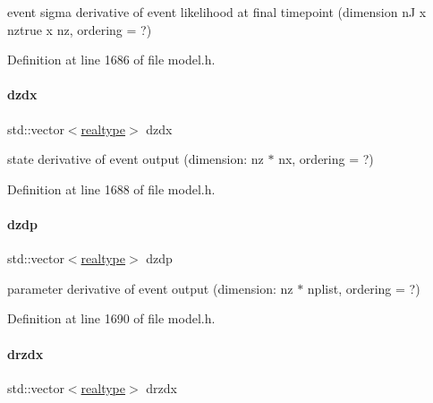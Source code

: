 event sigma derivative of event likelihood at final timepoint (dimension nJ x nztrue x nz, ordering = ?) 

Definition at line 1686 of file model.\+h.

\mbox{\label{classamici_1_1_model_a2f5f73b0bb67ee69c461c01e2dadaecc}} 
\paragraph{\texorpdfstring{dzdx}{dzdx}}
{\footnotesize\ttfamily std\+::vector$<$\mbox{\hyperlink{namespaceamici_a1bdce28051d6a53868f7ccbf5f2c14a3}{realtype}}$>$ dzdx\hspace{0.3cm}{\ttfamily [protected]}}

state derivative of event output (dimension\+: nz $\ast$ nx, ordering = ?) 

Definition at line 1688 of file model.\+h.

\mbox{\label{classamici_1_1_model_a5d743131ef6be8aa56865fd100acd137}} 
\paragraph{\texorpdfstring{dzdp}{dzdp}}
{\footnotesize\ttfamily std\+::vector$<$\mbox{\hyperlink{namespaceamici_a1bdce28051d6a53868f7ccbf5f2c14a3}{realtype}}$>$ dzdp\hspace{0.3cm}{\ttfamily [protected]}}

parameter derivative of event output (dimension\+: nz $\ast$ nplist, ordering = ?) 

Definition at line 1690 of file model.\+h.

\mbox{\label{classamici_1_1_model_acf722ef69da2112dc1c61d55c4e359ca}} 
\paragraph{\texorpdfstring{drzdx}{drzdx}}
{\footnotesize\ttfamily std\+::vector$<$\mbox{\hyperlink{namespaceamici_a1bdce28051d6a53868f7ccbf5f2c14a3}{realtype}}$>$ drzdx\hspace{0.3cm}{\ttfamily [protected]}}

